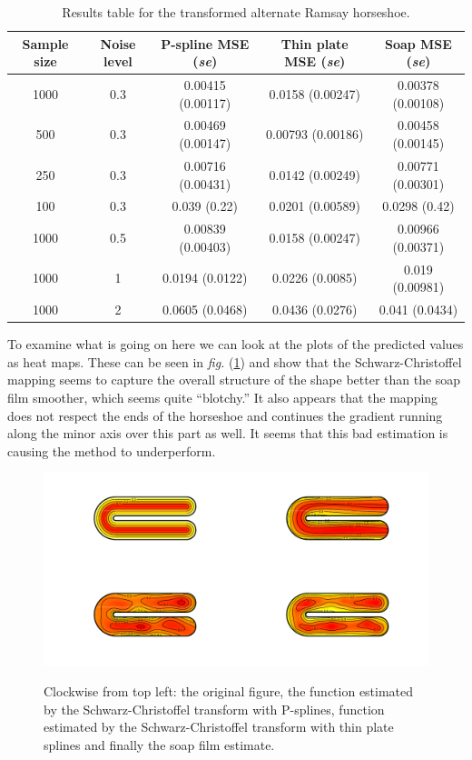 \documentclass[a4paper,10pt]{amsart}
\newcommand{\sch}{Schwarz-Christoffel }
\newcommand{\fig}[1]{\emph{fig.} (\ref{#1})}
\begin{document}
\begin{table}[ht]
\begin{tabular}{c c c c c}\\
Sample size & Noise level & P-spline MSE (\emph{se}) & Thin plate MSE (\emph{se}) & Soap MSE (\emph{se}) \\
\hline
\hline
1000 & 0.3 & 0.00415 (0.00117) & 0.0158 (0.00247) & 0.00378 (0.00108) \\ 
500 & 0.3 & 0.00469 (0.00147) & 0.00793 (0.00186) & 0.00458 (0.00145) \\ 
250 & 0.3 & 0.00716 (0.00431) & 0.0142 (0.00249) & 0.00771 (0.00301) \\ 
100 & 0.3 & 0.039 (0.22) & 0.0201 (0.00589) & 0.0298 (0.42) \\ 
1000 & 0.5 & 0.00839 (0.00403) & 0.0158 (0.00247) & 0.00966 (0.00371) \\ 
1000 & 1 & 0.0194 (0.0122) & 0.0226 (0.0085) & 0.019 (0.00981) \\ 
1000 & 2 & 0.0605 (0.0468) & 0.0436 (0.0276) & 0.041 (0.0434) \\ 
\end{tabular}
\label{altramsayresultstable}
\caption{Results table for the transformed alternate Ramsay horseshoe.}
\end{table}


To examine what is going on here we can look at the plots of the predicted values as heat maps. These can be seen in \fig{altramsaycomp} and show that the \sch mapping seems to capture the overall structure of the shape better than the soap film smoother, which seems quite ``blotchy.'' It also appears that the mapping does not respect the ends of the horseshoe and continues the gradient running along the minor axis over this part as well. It seems that this bad estimation is causing the method to underperform. 


\begin{figure}
\centering
\includegraphics[width=5in, trim=0in 0in 0in 0in]{figs/altramsaycomp.pdf}\\
\caption{Clockwise from top left: the original figure, the function estimated by the \sch transform with P-splines, function estimated by the \sch transform with thin plate splines and finally the soap film estimate.}
\label{altramsaycomp}
\end{figure}
\end{document}
